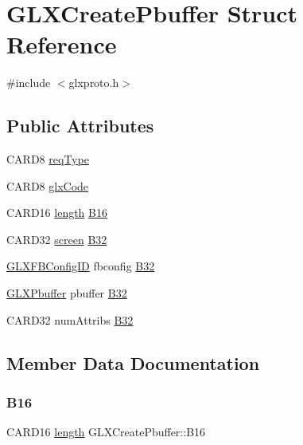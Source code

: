 \hypertarget{struct_g_l_x_create_pbuffer}{}\section{G\+L\+X\+Create\+Pbuffer Struct Reference}
\label{struct_g_l_x_create_pbuffer}


{\ttfamily \#include $<$glxproto.\+h$>$}

\subsection*{Public Attributes}
\begin{DoxyCompactItemize}
\item 
C\+A\+R\+D8 \hyperlink{struct_g_l_x_create_pbuffer_a218cb16421c2350fc76c09cbf0b8ce4b}{req\+Type}
\item 
C\+A\+R\+D8 \hyperlink{struct_g_l_x_create_pbuffer_a02e4be1767d5d9342b70e0661f0964cb}{glx\+Code}
\item 
C\+A\+R\+D16 \hyperlink{glcorearb_8h_ab9c919755bde3b34349e23a32b4e0fa7}{length} \hyperlink{struct_g_l_x_create_pbuffer_acc4746254312da8e83160e8c363c4ef9}{B16}
\item 
C\+A\+R\+D32 \hyperlink{cad_8h_ae04e09e4e3831bfc1632c509ae37dcec}{screen} \hyperlink{struct_g_l_x_create_pbuffer_a200cf806f17c5b3488a700fd5324ff6c}{B32}
\item 
\hyperlink{glx_8h_a38e78acefebf732d1a0da441ad1de05f}{G\+L\+X\+F\+B\+Config\+ID} fbconfig \hyperlink{struct_g_l_x_create_pbuffer_a2a94e743189554cd03ac4933d319801b}{B32}
\item 
\hyperlink{glx_8h_a0e12899d42d3570d659900a17247cb71}{G\+L\+X\+Pbuffer} pbuffer \hyperlink{struct_g_l_x_create_pbuffer_aeec02870507974ddb3cd921f77935aa7}{B32}
\item 
C\+A\+R\+D32 num\+Attribs \hyperlink{struct_g_l_x_create_pbuffer_aa4e4e3a524acecb4eafb79f77b26b02d}{B32}
\end{DoxyCompactItemize}


\subsection{Member Data Documentation}
\mbox{\label{struct_g_l_x_create_pbuffer_acc4746254312da8e83160e8c363c4ef9}} 
\subsubsection{\texorpdfstring{B16}{B16}}
{\footnotesize\ttfamily C\+A\+R\+D16 \hyperlink{glcorearb_8h_ab9c919755bde3b34349e23a32b4e0fa7}{length} G\+L\+X\+Create\+Pbuffer\+::\+B16}


